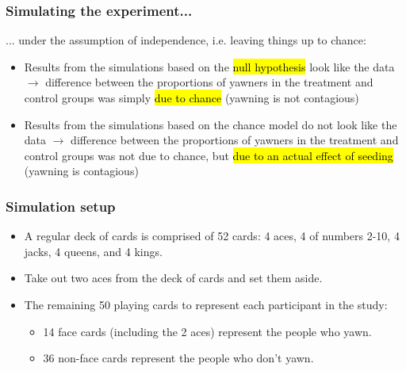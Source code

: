 \documentclass[11pt,containsverbatim,handout,xcolor=xelatex,dvipsnames,table]{beamer}
\begin{document}
\begin{frame}
\frametitle{Simulating the experiment...}

... under the assumption of independence, i.e. leaving things up to chance: \\

\pause

\begin{itemize}

\item Results from the simulations based on the \hl{null hypothesis} look like the data $\rightarrow$ difference between the proportions of yawners in the treatment and control groups was simply \hl{due to chance} (yawning is not contagious) \\

\pause

\item Results from the simulations based on the chance model do not look like the data $\rightarrow$ difference between the proportions of yawners in the treatment and control groups was not due to chance, but \hl{due to an actual effect of seeding} (yawning is contagious)

\end{itemize}

\end{frame}


\begin{frame}
\frametitle{Simulation setup}

\begin{itemize}

\item A regular deck of cards is comprised of 52 cards: 4 aces, 4 of numbers 2-10, 4 jacks, 4 queens, and 4 kings.

\item Take out two aces from the deck of cards and set them aside.

\item The remaining 50 playing cards to represent each participant in the study:
\begin{itemize}
\item 14 face cards (including the 2 aces) represent the people who yawn.
\item 36 non-face cards represent the people who don't yawn.
\end{itemize}

\end{itemize}

\end{frame}
\end{document}
